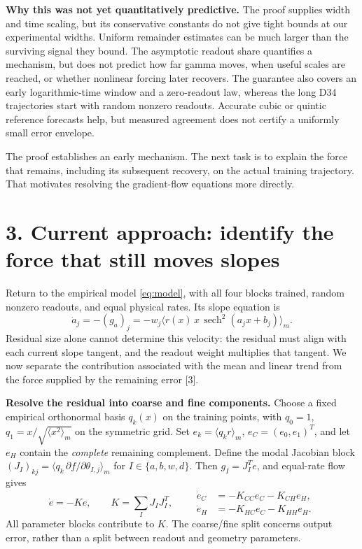 \documentclass[10pt]{article}
\DeclareMathOperator{\sech}{sech}
\newcommand{\avg}[1]{\langle #1\rangle_m}
\begin{document}
\textbf{Why this was not yet quantitatively predictive.}
The proof supplies width and time scaling, but its conservative constants do
not give tight bounds at our experimental widths. Uniform remainder estimates
can be much larger than the surviving signal they bound. The asymptotic
readout share quantifies a mechanism, but does not predict how far gamma moves,
when useful scales are reached, or whether nonlinear forcing later recovers.
The guarantee also covers an early logarithmic-time window and a zero-readout
law, whereas the long D34 trajectories start with random nonzero readouts.
Accurate cubic or quintic reference forecasts help, but measured agreement
does not certify a uniformly small error envelope.

The proof establishes an early mechanism. The next task is to explain the
force that remains, including its subsequent recovery, on the actual training
trajectory. That motivates resolving the gradient-flow equations more directly.

\clearpage
\section*{3. Current approach: identify the force that still moves slopes}
Return to the empirical model \eqref{eq:model}, with all four blocks trained,
random nonzero readouts, and equal physical rates. Its slope equation is
\begin{equation}\label{eq:slope}
 \dot a_j=-(g_a)_j
 =-w_j\avg{r(x)\,x\,\sech^2(a_jx+b_j)}.
\end{equation}
Residual size alone cannot determine this velocity: the residual must align
with each current slope tangent, and the readout weight multiplies that tangent.
We now separate the contribution associated with the mean and linear trend
from the force supplied by the remaining error [3].

\textbf{Resolve the residual into coarse and fine components.}
Choose a fixed empirical orthonormal basis $q_k(x)$ on the training points,
with $q_0=1$, $q_1=x/\sqrt{\avg{x^2}}$ on the symmetric grid.
Set $e_k=\avg{q_k r}$, $e_C=(e_0,e_1)^T$, and let $e_H$ contain the
\emph{complete} remaining complement. Define the modal Jacobian block
$(J_I)_{kj}=\avg{q_k\,\partial f/\partial\theta_{I,j}}$ for
$I\in\{a,b,w,d\}$. Then $g_I=J_I^Te$, and equal-rate flow gives
\begin{equation}\label{eq:modal}
 \dot e=-Ke,\qquad K=\sum_I J_IJ_I^T,
 \qquad
 \begin{aligned}
 \dot e_C&=-K_{CC}e_C-K_{CH}e_H,\\
 \dot e_H&=-K_{HC}e_C-K_{HH}e_H.
 \end{aligned}
\end{equation}
All parameter blocks contribute to $K$. The coarse/fine split concerns output
error, rather than a split between readout and geometry parameters.
\end{document}

